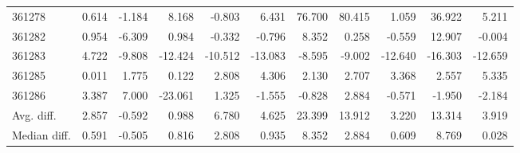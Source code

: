\begin{tabular}{lrrrrrrrrrr}
361278 & 0.614 & -1.184 & 8.168 & -0.803 & 6.431 & 76.700 & 80.415 & 1.059 & 36.922 & 5.211 \\
361282 & 0.954 & -6.309 & 0.984 & -0.332 & -0.796 & 8.352 & 0.258 & -0.559 & 12.907 & -0.004 \\
361283 & 4.722 & -9.808 & -12.424 & -10.512 & -13.083 & -8.595 & -9.002 & -12.640 & -16.303 & -12.659 \\
361285 & 0.011 & 1.775 & 0.122 & 2.808 & 4.306 & 2.130 & 2.707 & 3.368 & 2.557 & 5.335 \\
361286 & 3.387 & 7.000 & -23.061 & 1.325 & -1.555 & -0.828 & 2.884 & -0.571 & -1.950 & -2.184 \\
Avg. diff. & 2.857 & -0.592 & 0.988 & 6.780 & 4.625 & 23.399 & 13.912 & 3.220 & 13.314 & 3.919 \\
Median diff. & 0.591 & -0.505 & 0.816 & 2.808 & 0.935 & 8.352 & 2.884 & 0.609 & 8.769 & 0.028 \\
\bottomrule
\end{tabular}
